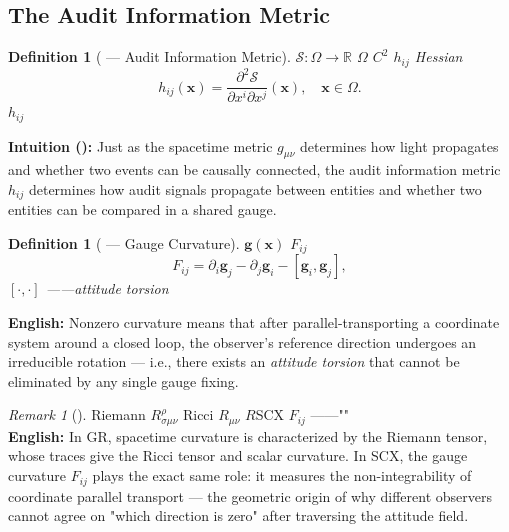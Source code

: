 \documentclass[12pt,a4paper]{article}
\newtheorem{definition}[theorem]{Definition}
\theoremstyle{remark}
\newtheorem{remark}[theorem]{Remark}
\newcommand{\R}{\mathbb{R}}
\newcommand{\g}{\mathbf{g}}
\newcommand{\x}{\mathbf{x}}
\begin{document}
\subsection{}
\subsection{The Audit Information Metric}

\begin{definition}[ — Audit Information Metric]\label{def:info_metric}
 $\mathcal{S}: \Omega \to \R$  $\Omega$  $C^2$ \textbf{} $h_{ij}$ Hessian
\begin{equation}
    h_{ij}(\x) = \frac{\partial^2 \mathcal{S}}{\partial x^i \partial x^j}(\x), \quad \x \in \Omega.
\end{equation}
 $h_{ij}$ 
\end{definition}

\vspace{4pt}
\noindent
\textbf{Intuition ():} Just as the spacetime metric $g_{\mu\nu}$ determines how light propagates and whether two events can be causally connected, the audit information metric $h_{ij}$ determines how audit signals propagate between entities and whether two entities can be compared in a shared gauge.

\begin{definition}[ — Gauge Curvature]\label{def:gauge_curvature}
 $\g(\x)$ \textbf{} $F_{ij}$ 
\begin{equation}
    F_{ij} = \partial_i \g_j - \partial_j \g_i - [\g_i, \g_j],
\end{equation}
 $[\cdot,\cdot]$ ——\textbf{}attitude torsion
\end{definition}

\vspace{4pt}
\noindent
\textbf{English:} Nonzero curvature means that after parallel-transporting a coordinate system around a closed loop, the observer's reference direction undergoes an irreducible rotation — i.e., there exists an \textit{attitude torsion} that cannot be eliminated by any single gauge fixing.

\begin{remark}[]\label{rmk:gr_correspondence}
Riemann $R^{\rho}_{\sigma\mu\nu}$ Ricci $R_{\mu\nu}$  $R$SCX $F_{ij}$ ——""\\
\textbf{English:} In GR, spacetime curvature is characterized by the Riemann tensor, whose traces give the Ricci tensor and scalar curvature. In SCX, the gauge curvature $F_{ij}$ plays the exact same role: it measures the non-integrability of coordinate parallel transport — the geometric origin of why different observers cannot agree on "which direction is zero" after traversing the attitude field.
\end{remark}
\end{document}
